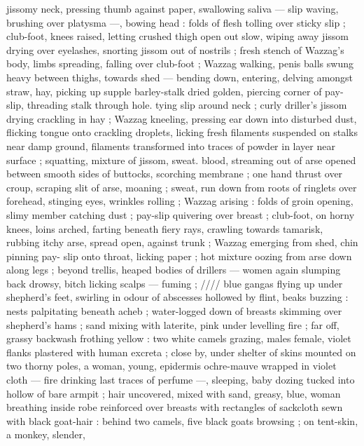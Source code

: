 jissomy neck, pressing thumb against paper, swallowing saliva --- 
slip waving, brushing over platysma ---, bowing head : folds of flesh 
tolling over sticky slip ; club-foot, knees raised, letting crushed thigh 
open out slow, wiping away jissom drying over eyelashes, snorting 
jissom out of nostrils ; fresh stench of Wazzag's body, limbs 
spreading, falling over club-foot ; Wazzag walking, penis balls swung 
heavy between thighs, towards shed --- bending down, entering, 
delving amongst straw, hay, picking up supple barley-stalk dried 
golden, piercing corner of pay-slip, threading stalk through hole. 
tying slip around neck ; curly driller's jissom drying crackling in hay 
; Wazzag kneeling, pressing ear down into disturbed dust, flicking 
tongue onto crackling droplets, licking fresh filaments suspended on 
stalks near damp ground, filaments transformed into traces of 
powder in layer near surface ; squatting, mixture of jissom, sweat. 
blood, streaming out of arse opened between smooth sides of 
buttocks, scorching membrane ; one hand thrust over croup, scraping 
slit of arse, moaning ; sweat, run down from roots of ringlets over 
forehead, stinging eyes, wrinkles rolling ; Wazzag arising : folds of 
groin opening, slimy member catching dust ; pay-slip quivering over 
breast ; club-foot, on horny knees, loins arched, farting beneath 
fiery rays, crawling towards tamarisk, rubbing itchy arse, spread 
open, against trunk ; Wazzag emerging from shed, chin pinning pay- 
slip onto throat, licking paper ; hot mixture oozing from arse down 
along legs ; beyond trellis, heaped bodies of drillers --- women 
again slumping back drowsy, bitch licking scalps --- fuming ; {\slash}{\slash}{\slash}{\slash} blue 
gangas flying up under shepherd's feet, swirling in odour of 
abscesses hollowed by flint, beaks buzzing : nests palpitating 
beneath acheb ; water-logged down of breasts skimming over 
shepherd's hams ; sand mixing with laterite, pink under levelling fire 
; far off, grassy backwash frothing yellow : two white camels grazing, 
males female, violet flanks plastered with human excreta ; close by, 
under shelter of skins mounted on two thorny poles, a woman, 
young, epidermis ochre-mauve wrapped in violet cloth --- fire 
drinking last traces of perfume ---, sleeping, baby dozing tucked into 
hollow of bare armpit ; hair uncovered, mixed with sand, greasy, 
blue, woman breathing inside robe reinforced over breasts with 
rectangles of sackcloth sewn with black goat-hair : behind two 
camels, five black goats browsing ; on tent-skin, a monkey, slender, 
